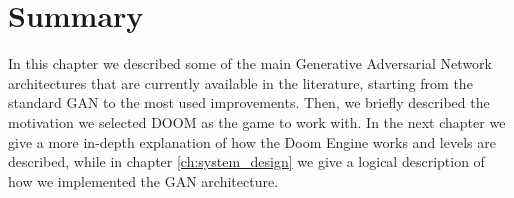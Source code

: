 \section{Summary}
In this chapter we described some of the main Generative Adversarial Network architectures that are currently available in the literature, starting from the standard GAN to the most used improvements. Then, we briefly described the motivation we selected DOOM as the game to work with. In the next chapter we give a more in-depth explanation of how the Doom Engine works and levels are described, while in chapter \ref{ch:system_design} we give a logical description of how we implemented the GAN architecture. 